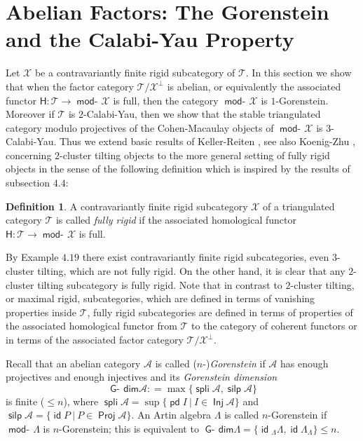 \documentclass[oneside, a4paper,reqno]{amsart}
\numberwithin{equation}{section}
\theoremstyle{definition}
\newtheorem{defn}[thm]{Definition}
\begin{document}
  
  
\section{Abelian Factors: The Gorenstein and the Calabi-Yau Property}
  
Let ${\mathcal X}$ be a contravariantly finite rigid subcategory of ${\mathcal T}$.  In this section we show that when the factor category ${\mathcal T}/{\mathcal X}^{\bot}$ is abelian, or equivalently the associated functor $\mathsf{H} \colon {\mathcal T} {\longrightarrow} \operatorname*{\mathsf{mod}-\!}{\mathcal X}$ is full, then the category $\operatorname*{\mathsf{mod}-\!}{\mathcal X}$ is $1$-Gorenstein. Moreover if ${\mathcal T}$ is $2$-Calabi-Yau, then we show that the stable triangulated category modulo projectives  of the Cohen-Macaulay objects of $\operatorname*{\mathsf{mod}-\!}{\mathcal X}$ is $3$-Calabi-Yau. Thus we extend  basic results of Keller-Reiten \cite{KR1}, see also Koenig-Zhu \cite{KZ}, concerning $2$-cluster tilting objects to the more general setting of fully rigid objects in the sense of the following definition which is inspired by the results of subsection $4.4$:   
  

\begin{defn} A contravariantly finite rigid subcategory ${\mathcal X}$ of a triangulated category  ${\mathcal T}$ is called {\em fully rigid} if the associated homological functor $\mathsf{H} \colon {\mathcal T} {\longrightarrow} \operatorname*{\mathsf{mod}-\!}{\mathcal X}$ is full. 
\end{defn} 

By Example $4.19$ there exist contravariantly finite rigid subcategories, even $3$-cluster tilting, which are not fully rigid. On the other hand, it is clear that any $2$-cluster tilting subcategory is fully rigid. Note that in contrast to $2$-cluster tilting, or maximal rigid,  subcategories, which are defined in terms of vanishing properties inside  ${\mathcal T}$, fully rigid subcategories  are defined in terms of properties of the associated homological functor from ${\mathcal T}$  to the category of coherent functors or in terms of the associated factor category ${\mathcal T}/{\mathcal X}^{\bot}$. 

  Recall that an abelian category ${\mathscr A}$ is called ($n$-){\em Gorenstein} if ${\mathscr A}$ has enough projectives and enough injectives and its {\em Gorenstein dimension} 
\[\operatorname*{\mathsf{G}-\!}\mathsf{dim}{\mathscr A} : =\max\{\operatorname*{\mathsf{spli}}{\mathscr A}, \operatorname*{\mathsf{silp}}{\mathscr A}\}\]
 is finite ($\leq n$), where $\operatorname*{\mathsf{spli}}{\mathscr A} = \sup\{\operatorname{\mathsf{pd}} I \ | \ I \in \operatorname*{\mathsf{Inj}}{\mathscr A} \}$ and $\operatorname*{\mathsf{silp}}{\mathscr A} = \{\operatorname*{\mathsf{id}} P \ | \ P \in \operatorname*{\mathsf{Proj}}{\mathscr A}\}$.   An Artin algebra $\Lambda$ is called $n$-Gorenstein if $\operatorname*{\mathsf{mod}-\!}\Lambda$ is $n$-Gorenstein; this is equivalent to $\operatorname*{\mathsf{G}-\!}\mathsf{dim}\Lambda = \{\operatorname*{\mathsf{id}}{_{\Lambda}}\Lambda,\operatorname*{\mathsf{id}}\Lambda_{\Lambda}\} \leq n$. 
  
\end{document}
